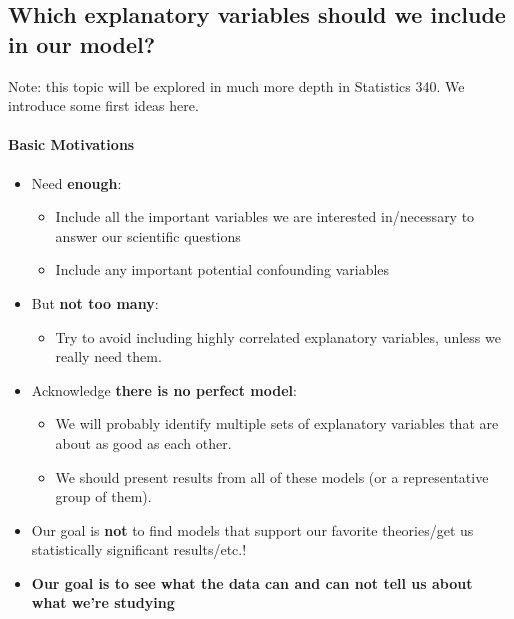 \documentclass[landscape]{article}
\providecommand{\tightlist}{%
  \setlength{\itemsep}{0pt}\setlength{\parskip}{0pt}}
\let\oldparagraph\paragraph
\renewcommand{\paragraph}[1]{\oldparagraph{#1}\mbox{}}
\begin{document}
\subsection{Which explanatory variables should we include in our
model?}\label{which-explanatory-variables-should-we-include-in-our-model}

Note: this topic will be explored in much more depth in Statistics 340.
We introduce some first ideas here.

\paragraph{Basic Motivations}\label{basic-motivations}

\begin{itemize}
\tightlist
\item
  Need \textbf{enough}:

  \begin{itemize}
  \tightlist
  \item
    Include all the important variables we are interested in/necessary
    to answer our scientific questions
  \item
    Include any important potential confounding variables
  \end{itemize}
\item
  But \textbf{not too many}:

  \begin{itemize}
  \tightlist
  \item
    Try to avoid including highly correlated explanatory variables,
    unless we really need them.
  \end{itemize}
\item
  Acknowledge \textbf{there is no perfect model}:

  \begin{itemize}
  \tightlist
  \item
    We will probably identify multiple sets of explanatory variables
    that are about as good as each other.
  \item
    We should present results from all of these models (or a
    representative group of them).
  \end{itemize}
\item
  Our goal is \textbf{not} to find models that support our favorite
  theories/get us statistically significant results/etc.!
\item
  \textbf{Our goal is to see what the data can and can not tell us about
  what we're studying}
\end{itemize}
\end{document}
